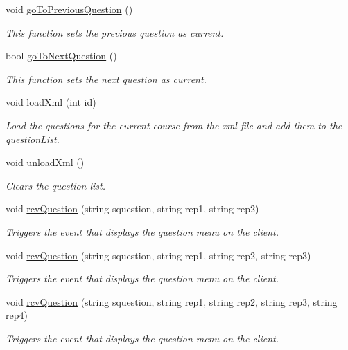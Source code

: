 \begin{DoxyCompactItemize}
\item 
void \hyperlink{class_question_manager_a0c8730b4ca5eb183f828f0dad9524b08}{go\-To\-Previous\-Question} ()
\begin{DoxyCompactList}\small\item\em This function sets the previous question as current.\end{DoxyCompactList}\item 
bool \hyperlink{class_question_manager_ad951c82ca60e66a5e088aeaf84436b74}{go\-To\-Next\-Question} ()
\begin{DoxyCompactList}\small\item\em This function sets the next question as current.\end{DoxyCompactList}\item 
void \hyperlink{class_question_manager_a315479a75a155fd8627ec81c87dfc644}{load\-Xml} (int id)
\begin{DoxyCompactList}\small\item\em Load the questions for the current course from the xml file and add them to the question\-List.\end{DoxyCompactList}\item 
void \hyperlink{class_question_manager_a6f660949810e7aa48511cef50d093e72}{unload\-Xml} ()
\begin{DoxyCompactList}\small\item\em Clears the question list.\end{DoxyCompactList}\item 
void \hyperlink{class_question_manager_a3fd0fdb36b5ea2337c4aa82d1380a0c7}{rcv\-Question} (string squestion, string rep1, string rep2)
\begin{DoxyCompactList}\small\item\em Triggers the event that displays the question menu on the client.\end{DoxyCompactList}\item 
void \hyperlink{class_question_manager_a6a83b29e2b2bcba856c58ced4a28c539}{rcv\-Question} (string squestion, string rep1, string rep2, string rep3)
\begin{DoxyCompactList}\small\item\em Triggers the event that displays the question menu on the client.\end{DoxyCompactList}\item 
void \hyperlink{class_question_manager_a9470261df43c527c54f760cba2f02968}{rcv\-Question} (string squestion, string rep1, string rep2, string rep3, string rep4)
\begin{DoxyCompactList}\small\item\em Triggers the event that displays the question menu on the client.\end{DoxyCompactList}\item 

\end{DoxyCompactItemize}
